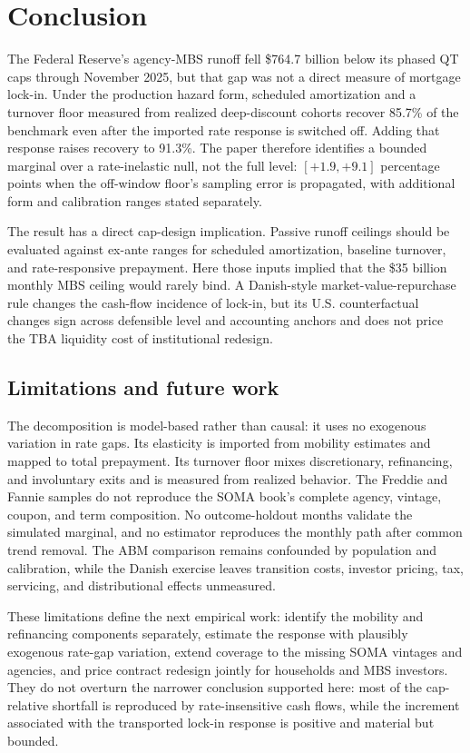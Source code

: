 \documentclass[12pt]{article}
\begin{document}
\section{Conclusion}\label{sec:conclusion}
The Federal Reserve's agency-MBS runoff fell \$764.7 billion below its phased
QT caps through November 2025, but that gap was not a direct measure of mortgage
lock-in. Under the production hazard form, scheduled amortization and a turnover
floor measured from realized deep-discount cohorts recover 85.7\% of the
benchmark even after the imported rate response is switched off. Adding that
response raises recovery to 91.3\%. The paper therefore identifies a bounded
marginal over a rate-inelastic null, not the full level: $[+1.9,+9.1]$
percentage points when the off-window floor's sampling error is propagated,
with additional form and calibration ranges stated separately.

The result has a direct cap-design implication. Passive runoff ceilings should
be evaluated against ex-ante ranges for scheduled amortization, baseline
turnover, and rate-responsive prepayment. Here those inputs implied that the
\$35 billion monthly MBS ceiling would rarely bind. A Danish-style
market-value-repurchase rule changes the cash-flow incidence of lock-in, but
its U.S. counterfactual changes sign across defensible level and accounting
anchors and does not price the TBA liquidity cost of institutional redesign.

\subsection{Limitations and future work}\label{sec:limitations}

The decomposition is model-based rather than causal: it uses no exogenous
variation in rate gaps. Its elasticity is imported from mobility estimates and
mapped to total prepayment. Its turnover floor mixes discretionary,
refinancing, and involuntary exits and is measured from realized behavior. The
Freddie and Fannie samples do not reproduce the SOMA book's complete agency,
vintage, coupon, and term composition. No outcome-holdout months validate the
simulated marginal, and no estimator reproduces the monthly path after common
trend removal. The ABM comparison remains confounded by population and
calibration, while the Danish exercise leaves transition costs, investor
pricing, tax, servicing, and distributional effects unmeasured.

These limitations define the next empirical work: identify the mobility and
refinancing components separately, estimate the response with plausibly
exogenous rate-gap variation, extend coverage to the missing SOMA vintages and
agencies, and price contract redesign jointly for households and MBS investors.
They do not overturn the narrower conclusion supported here: most of the
cap-relative shortfall is reproduced by rate-insensitive cash flows, while the
increment associated with the transported lock-in response is positive and
material but bounded.
\end{document}
